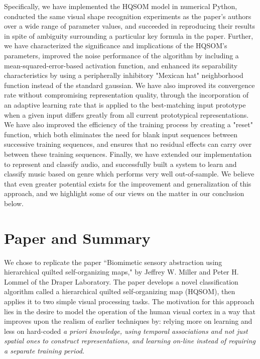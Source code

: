 \documentclass[a4paper,10pt]{article}
\begin{document}
Specifically, we have implemented the HQSOM model in numerical Python, conducted the same visual
shape recognition experiments as the paper's authors over a wide range of parameter values, and
succeeded in reproducing their results in spite of ambiguity surrounding a particular key formula in
the paper. Further, we have characterized the significance and implications of the HQSOM's
parameters, improved the noise performance of the algorithm by including a mean-squared-error-based
activation function, and enhanced its separability characteristics by using a peripherally
inhibitory "Mexican hat" neighborhood function instead of the standard gaussian.  We have also
improved its convergence rate without
compromising representation quality, through the incorporation of an adaptive learning rate that is
applied to the best-matching input
prototype when a given input differs greatly from all current prototypical
representations.  We have also improved the efficiency of the training process by
creating a "reset" function, which both eliminates the need for blank input sequences between
successive training sequences, and ensures that no residual effects can carry over between these
training sequences. Finally, we have extended our implementation to represent and classify
audio, and successfully built a system to learn and classify music based on genre which performs
very well out-of-sample. We believe that even greater potential exists for the improvement and
generalization of this approach, and we highlight some of our views on the matter in our conclusion
below.

\section{Paper and Summary}

We chose to replicate the paper ``Biomimetic sensory abstraction using hierarchical quilted
self-organizing maps," by Jeffrey W. Miller and Peter H. Lommel of the Draper Laboratory. The paper
develops a novel classification algorithm called a hierarchical quilted self-organizing map (HQSOM),
then applies it to two simple visual processing tasks. The motivation for this approach lies in the
desire to model the operation of the human visual cortex in a way that improves upon the realism of
earlier techniques by: relying more on learning and less on hard-coded \em a priori \em knowledge,
using temporal associations and not just spatial ones to construct representations, and learning
on-line instead of requiring a separate training period.
\end{document}
